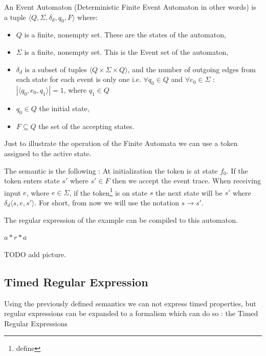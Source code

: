 				
				\begin{dfn}
					\label{dfn:cep:ea}
					An Event Automaton (Deterministic Finite Event Automaton in other words) is a tuple $\langle Q,\Sigma,\delta_d,q_0, F \rangle$  where: 
						\begin{itemize}
							\item $Q$ is a finite, nonempty set. These are the states of the automaton,
							\item $\Sigma$ is a finite, nonempty set. This is the Event set of the automaton,
							\item $\delta_d$ is a subset of tuples $\langle Q \times \Sigma \times Q \rangle$,
								and the number of outgoing edges from each state for each event is only one 
								i.e. $\forall q_0 \in Q$ and $\forall e_0 \in \Sigma$ : $|\langle q_0, e_0, q_1 \rangle| = 1$, where $q_1 \in Q$ 
							\item $q_0 \in Q$ the initial state,
							\item $F \subseteq Q$ the set of the accepting states.
						\end{itemize}	
				\end{dfn}
				
				Just to illustrate the operation of the Finite Automata we can use a token assigned to the active state.

				The semantic is the following : 
				At initialization the token is at state $f_0$.
				If the token enters state $s'$ where $s' \in F$ then we accept the event trace. 
				When receiving input $e$, where $e \in \Sigma$, if the token\footnote{define} is on state $s$ the next state will be $s'$ where %
				$\delta_d \langle s,e,s' \rangle$. For short, from now we will use the notation $s \rightarrow s'$. 
				
				The regular expression of the example can be compiled to this automaton.
				
				$a\ast r \ast a$
				
				TODO add picture.
				

			
		\subsection{Timed Regular Expression}
		
			Using the previously defined semantics we can not express timed properties,
			but regular expressions can be expanded to a formalism which can do so : 
			the Timed Regular Expressions
			

